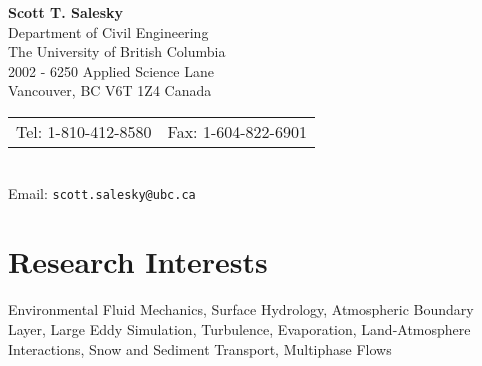 \documentclass[11pt,letterpaper]{article}
\begin{document}

\pagestyle{empty}           %
\pagestyle{fancy}
\fancyfoot{}                        %
\fancyhead{}                        %
\renewcommand{\headrulewidth}{0pt}

\begin{center}
    \textbf{\Large Scott T. Salesky} \\
    Department of Civil Engineering \\
    The University of British Columbia \\
    2002 - 6250 Applied Science Lane \\
    Vancouver, BC V6T 1Z4 Canada \\
    \begin{tabular}{c c}
        Tel: 1-810-412-8580 & Fax: 1-604-822-6901
    \end{tabular} \\
    Email: \texttt{scott.salesky@ubc.ca}
\end{center}

\section*{Research Interests} 

Environmental Fluid Mechanics, Surface Hydrology, Atmospheric Boundary Layer,
Large Eddy Simulation, Turbulence, Evaporation, Land-Atmosphere Interactions,
Snow and Sediment Transport, Multiphase Flows

\end{document}
